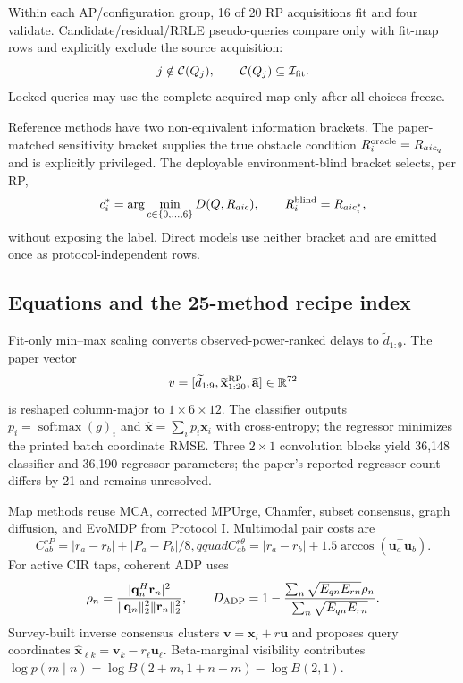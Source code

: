 \documentclass[10pt]{article}
\newcommand{\R}{\mathbb R}
\begin{document}
Within each AP/configuration group, 16 of 20 RP acquisitions fit and four
validate.  Candidate/residual/RRLE pseudo-queries compare only with fit-map
rows and explicitly exclude the source acquisition:
\begin{equation}
 j\notin\mathcal C(Q_j),\qquad \mathcal C(Q_j)\subseteq\mathcal I_{\rm fit}.
\end{equation}
Locked queries may use the complete acquired map only after all choices freeze.

Reference methods have two non-equivalent information brackets.  The
paper-matched sensitivity bracket supplies the true obstacle condition
$R_i^{\rm oracle}=R_{aic_q}$ and is explicitly privileged.  The deployable
environment-blind bracket selects, per RP,
\begin{equation}
 c_i^*=\arg\min_{c\in\{0,\ldots,6\}}D(Q,R_{aic}),\qquad
 R_i^{\rm blind}=R_{aic_i^*},
\end{equation}
without exposing the label.  Direct models use neither bracket and are emitted
once as protocol-independent rows.

\subsection{Equations and the 25-method recipe index}

Fit-only min--max scaling converts observed-power-ranked delays to
$\widetilde d_{1:9}$.  The paper vector
\begin{equation}
 v=[\widetilde d_{1:9},\widetilde{\mathbf x}_{1:20}^{\rm RP},
 \widetilde{\mathbf a}]\in\R^{72}
\end{equation}
is reshaped column-major to $1\times6\times12$.  The classifier outputs
$p_i=\operatorname{softmax}(g)_i$ and
$\widehat{\mathbf x}=\sum_i p_i\mathbf x_i$ with cross-entropy; the regressor
minimizes the printed batch coordinate RMSE.  Three $2\times1$ convolution
blocks yield 36,148 classifier and 36,190 regressor parameters; the paper's
reported regressor count differs by 21 and remains unresolved.

Map methods reuse MCA, corrected MPUrge, Chamfer, subset consensus, graph
diffusion, and EvoMDP from Protocol I.  Multimodal pair costs are
\begin{equation}
 C_{ab}^{rP}=|r_a-r_b|+|P_a-P_b|/8,qquad
 C_{ab}^{r\theta}=|r_a-r_b|+1.5\arccos(\mathbf u_a^\top\mathbf u_b).
\end{equation}
For active CIR taps, coherent ADP uses
\begin{equation}
 \rho_n=\frac{|\mathbf q_n^H\mathbf r_n|^2}
 {\|\mathbf q_n\|_2^2\|\mathbf r_n\|_2^2},\qquad
 D_{\rm ADP}=1-\frac{\sum_n\sqrt{E_{qn}E_{rn}}\rho_n}
 {\sum_n\sqrt{E_{qn}E_{rn}}}.
\end{equation}
Survey-built inverse consensus clusters $\mathbf v=\mathbf x_i+r\mathbf u$
and proposes query coordinates $\widehat{\mathbf x}_{\ell k}=\mathbf v_k-r_\ell\mathbf u_\ell$.
Beta-marginal visibility contributes
$\log p(m\mid n)=\log B(2+m,1+n-m)-\log B(2,1)$.
\end{document}
